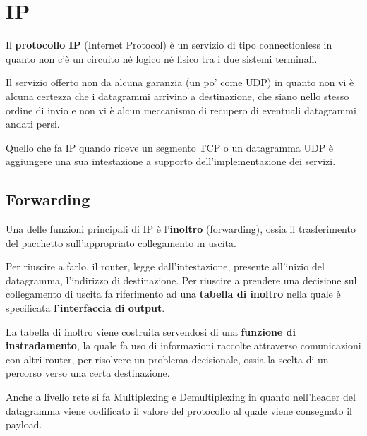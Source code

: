 \section{IP}
Il \textbf{protocollo IP} (Internet Protocol) è un servizio di tipo connectionless in quanto non
c'è un circuito né logico né fisico tra i due sistemi terminali.

Il servizio offerto non da alcuna garanzia (un po' come UDP) in quanto non vi è alcuna certezza 
che i datagrammi arrivino a destinazione, che siano nello stesso ordine di invio e non vi è alcun
meccanismo di recupero di eventuali datagrammi andati persi.

Quello che fa IP quando riceve un segmento TCP o un datagramma UDP è aggiungere una sua 
intestazione a supporto dell'implementazione dei servizi.

\subsection{Forwarding}
Una delle funzioni principali di IP è l'\textbf{inoltro} (forwarding), ossia il trasferimento del
pacchetto sull'appropriato collegamento in uscita.

Per riuscire a farlo, il router, legge  dall'intestazione, presente all'inizio del datagramma,
l'indirizzo di destinazione. Per riuscire a prendere una decisione sul collegamento di uscita fa 
riferimento ad una \textbf{tabella di inoltro} nella quale è specificata \textbf{ l'interfaccia di
output}.

La tabella di inoltro viene costruita servendosi di una \textbf{funzione di instradamento}, la
quale fa uso di informazioni raccolte attraverso comunicazioni con altri router, per risolvere
un problema decisionale, ossia la scelta di un percorso verso una certa destinazione.

Anche a livello rete si fa Multiplexing e Demultiplexing in quanto nell'header del datagramma
viene codificato il valore del protocollo al quale viene consegnato il payload.

